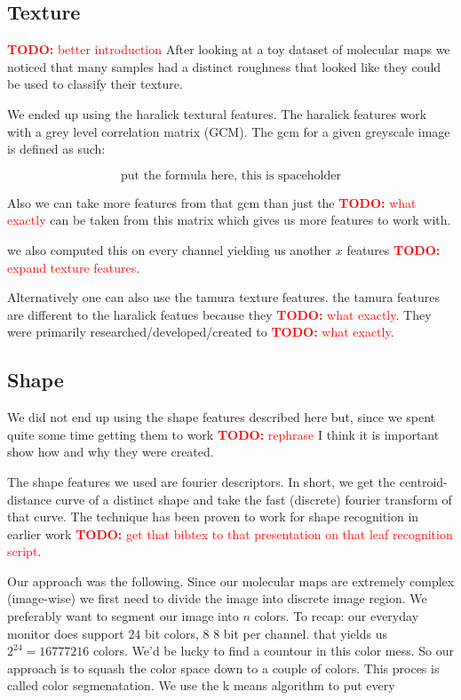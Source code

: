 \documentclass[journal]{vgtc}       %
\newcommand{\todo}[1]{\textcolor{red}{\textbf{TODO:} #1}}
\begin{document}
\subsection{Texture}
\todo{better introduction}
After looking at a toy dataset of molecular maps we noticed that many samples had a distinct roughness that looked like they could be used to classify their texture.

We ended up using the haralick textural features. The haralick features work with a grey level correlation matrix (GCM). The gcm for a given greyscale image is defined as such:

\[\text{put the formula here, this is spaceholder}\]

Also we can take more features from that gcm than just the \todo{what exactly} can be taken from this matrix which gives us more features to work with.

we also computed this on every channel yielding us another \(x\) features \todo{expand texture features}.

Alternatively one can also use the tamura texture features. the tamura features are different to the haralick featues because they \todo{what exactly}.
They were primarily researched/developed/created to \todo{what exactly}. 	

\subsection{Shape}
We did not end up using the shape features described here but, since we spent quite some time getting them to work \todo{rephrase} I think it is important show how and why they were created.

The shape features we used are fourier descriptors. In short, we get the centroid-distance curve of a distinct shape and take the fast (discrete) fourier transform of that curve. The technique has been proven to work for shape recognition  in earlier work \todo{get that bibtex to that presentation on that leaf recognition script}.

Our approach was the following.  Since our molecular maps are extremely complex (image-wise) we first need to divide the image into discrete image region.  We preferably want to segment our image into $n$ colors. To recap: our everyday monitor does support \(24\) bit colors, \(8 \) 8 bit per channel. that yields us \(2^{24}=16777216 \) colors.
We'd be lucky to find a countour in this color mess.
So our approach is to squash the color space down to a couple of colors.
This proces is called color segmenatation. We use the k means algorithm to put every 
\end{document}
